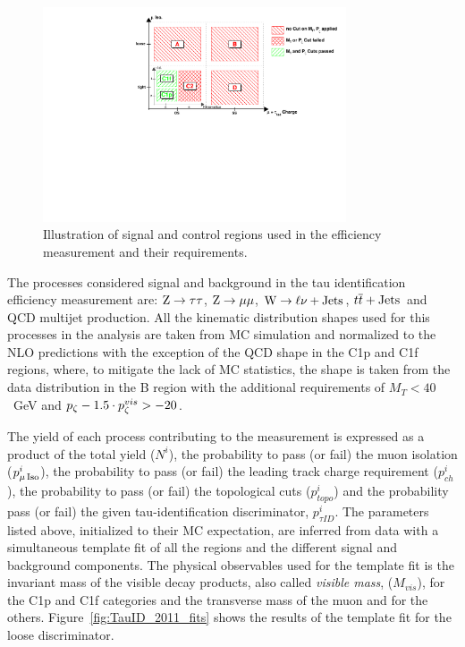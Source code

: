 \begin{figure}
\begin{center}
\includegraphics[angle=-0,width=0.8\textwidth]{3_Evt_Reconstruction/pics/figTauIdEffIllustration.pdf}
\caption{Illustration of signal and control regions used in the efficiency measurement and their requirements.
\label{fig:tau_eff_ABCD}
}
\end{center}
\end{figure}

The processes considered signal and background in the tau identification efficiency measurement %
are: $\Z\To\tau\tau$, $\Z\To\mu\mu$, $\W\To\ell\nu+\rm{Jets}$, $t\anti{t}+\rm{Jets}$\ and QCD multijet production. All the kinematic distribution shapes used for this processes in the analysis are taken from MC simulation and normalized to the NLO predictions with the exception of the QCD shape in the C1p and C1f regions, where, to mitigate the lack of MC statistics, the shape is taken from the data distribution in the B region with the additional requirements of $M_T < 40$\ GeV and $\pz -1.5 \cdot \pz^{vis} > -20$. 

The yield of each process contributing to the measurement is expressed as a product of the total yield ($N^i$), the probability to pass (or fail) the muon isolation ($p_{\mu\,\rm{Iso}}^i$), the probability to pass (or fail) the leading track charge requirement ($p_{ch}^i$), the probability to pass (or fail) the topological cuts ($p_{topo}^i$) and the probability pass (or fail) the given tau-identification discriminator, $p_{\tau ID}^i$. The parameters listed above, initialized to their MC expectation, are inferred from data with a simultaneous template fit of all the regions and the different signal and background components. The physical observables used for the template fit is the invariant mass of the visible decay products, also called \emph{visible mass}, ($M_{vis}$), for the C1p and C1f categories and the transverse mass of the muon and \MET for the others. Figure~\ref{fig:TauID_2011_fits} shows the results of the template fit for the loose discriminator.

